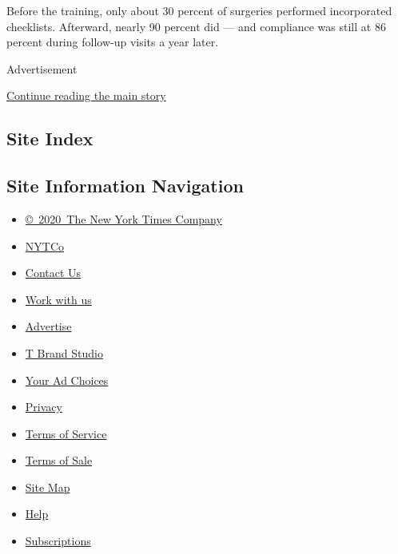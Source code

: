 Before the training, only about 30 percent of surgeries performed
incorporated checklists. Afterward, nearly 90 percent did --- and
compliance was still at 86 percent during follow-up visits a year later.

Advertisement

\protect\hyperlink{after-bottom}{Continue reading the main story}

\hypertarget{site-index}{%
\subsection{Site Index}\label{site-index}}

\hypertarget{site-information-navigation}{%
\subsection{Site Information
Navigation}\label{site-information-navigation}}

\begin{itemize}
\tightlist
\item
  \href{https://help.nytimes3xbfgragh.onion/hc/en-us/articles/115014792127-Copyright-notice}{©~2020~The
  New York Times Company}
\end{itemize}

\begin{itemize}
\tightlist
\item
  \href{https://www.nytco.com/}{NYTCo}
\item
  \href{https://help.nytimes3xbfgragh.onion/hc/en-us/articles/115015385887-Contact-Us}{Contact
  Us}
\item
  \href{https://www.nytco.com/careers/}{Work with us}
\item
  \href{https://nytmediakit.com/}{Advertise}
\item
  \href{http://www.tbrandstudio.com/}{T Brand Studio}
\item
  \href{https://www.nytimes3xbfgragh.onion/privacy/cookie-policy\#how-do-i-manage-trackers}{Your
  Ad Choices}
\item
  \href{https://www.nytimes3xbfgragh.onion/privacy}{Privacy}
\item
  \href{https://help.nytimes3xbfgragh.onion/hc/en-us/articles/115014893428-Terms-of-service}{Terms
  of Service}
\item
  \href{https://help.nytimes3xbfgragh.onion/hc/en-us/articles/115014893968-Terms-of-sale}{Terms
  of Sale}
\item
  \href{https://spiderbites.nytimes3xbfgragh.onion}{Site Map}
\item
  \href{https://help.nytimes3xbfgragh.onion/hc/en-us}{Help}
\item
  \href{https://www.nytimes3xbfgragh.onion/subscription?campaignId=37WXW}{Subscriptions}
\end{itemize}
